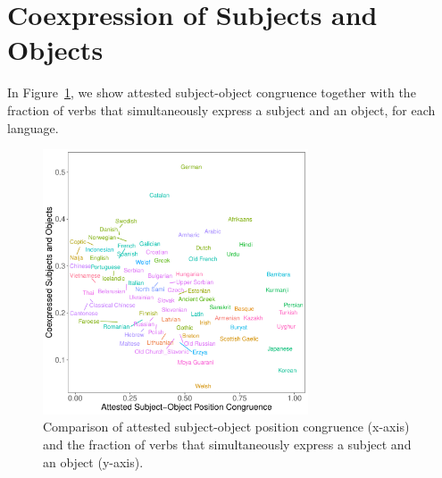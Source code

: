 \documentclass[11pt,a4paper]{article}
\newcommand\mhahn[1]{{\color{red}(#1)}}
\begin{document}



\section{Coexpression of Subjects and Objects}
In Figure~\ref{fig:study2}, we show attested subject-object congruence together with the fraction of verbs that simultaneously express a subject and an object, for each language.

\begin{figure}
    \centering
    \includegraphics[width=0.7\textwidth]{../analysis/figures/objects-order-pureud-byVerb_FORMAT.pdf}
    \caption{Comparison of attested subject-object position congruence (x-axis) and the fraction of verbs that simultaneously express a subject and an object (y-axis).}
    \label{fig:study2}
\end{figure}






\end{document}
